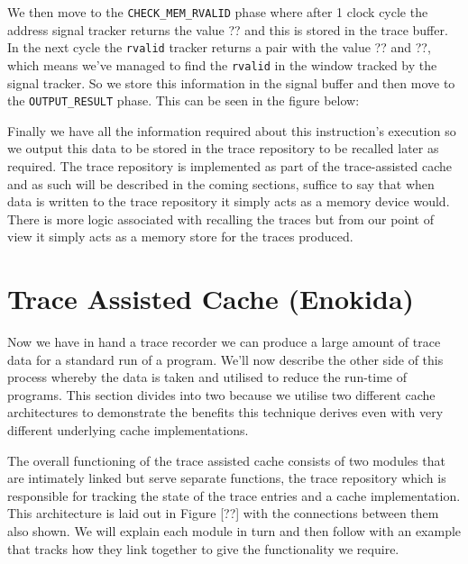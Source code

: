 

We then move to the \texttt{CHECK\_MEM\_RVALID} phase where after 1 clock cycle the address signal tracker returns the value ?? and this is stored in the trace buffer. In the next cycle the \texttt{rvalid} tracker returns a pair with the value ?? and ??, which means we've managed to find the \texttt{rvalid} in the window tracked by the signal tracker. So we store this information in the signal buffer and then move to the \texttt{OUTPUT\_RESULT} phase. This can be seen in the figure below:


Finally we have all the information required about this instruction's execution so we output this data to be stored in the trace repository to be recalled later as required. The trace repository is implemented as part of the trace-assisted cache and as such will be described in the coming sections, suffice to say that when data is written to the trace repository it simply acts as a memory device would. There is more logic associated with recalling the traces but from our point of view it simply acts as a memory store for the traces produced.


\section{Trace Assisted Cache (Enokida)}

Now we have in hand a trace recorder we can produce a large amount of trace data for a standard run of a program. We'll now describe the other side of this process whereby the data is taken and utilised to reduce the run-time of programs. This section divides into two because we utilise two different cache architectures to demonstrate the benefits this technique derives even with very different underlying cache implementations. 

The overall functioning of the trace assisted cache consists of two modules that are intimately linked but serve separate functions, the trace repository which is responsible for tracking the state of the trace entries and a cache implementation. This architecture is laid out in Figure [??] with the connections between them also shown. We will explain each module in turn and then follow with an example that tracks how they link together to give the functionality we require.

